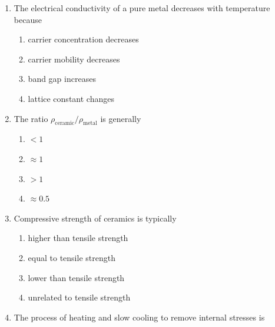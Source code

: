 \documentclass[journal,12pt,onecolumn]{IEEEtran}
\begin{document}
\begin{enumerate}[label=\arabic*)]
\item The electrical conductivity of a pure metal decreases with temperature because
\hfill{} \\

\vspace{0.2cm}
\begin{enumerate}[label=\alph*)]
\item carrier concentration decreases
\item carrier mobility decreases
\item band gap increases
\item lattice constant changes
\end{enumerate}
\vspace{0.5cm}

\item The ratio $\rho_{\text{ceramic}}/\rho_{\text{metal}}$ is generally  
\hfill{} \\

\vspace{0.2cm}
\begin{enumerate}[label=\alph*)]
\item $<1$
\item $\approx 1$
\item $>1$
\item $\approx 0.5$
\end{enumerate}
\vspace{0.5cm}

\item Compressive strength of ceramics is typically  
\hfill{} \\

\vspace{0.2cm}
\begin{enumerate}[label=\alph*)]
\item higher than tensile strength
\item equal to tensile strength
\item lower than tensile strength
\item unrelated to tensile strength
\end{enumerate}
\vspace{0.5cm}

\item The process of heating and slow cooling to remove internal stresses is  \hfill{} \\


\end{enumerate}
\end{document}
